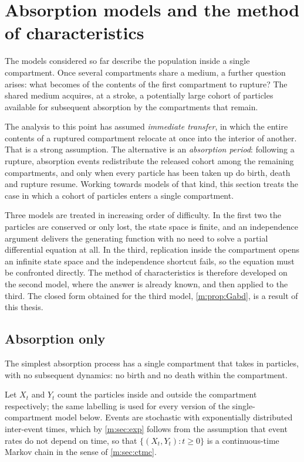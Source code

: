 \section{Absorption models and the method of characteristics}
\label{m:sec:moc}

The models considered so far describe the population inside a single compartment.
Once several compartments share a medium, a further question arises: what becomes
of the contents of the first compartment to rupture? The shared medium acquires, at
a stroke, a potentially large cohort of particles available for subsequent
absorption by the compartments that remain.

The analysis to this point has assumed \emph{immediate transfer}, in which the
entire contents of a ruptured compartment relocate at once into the interior of
another. That is a strong assumption. The alternative is an \emph{absorption
period}: following a rupture, absorption events redistribute the released cohort
among the remaining compartments, and only when every particle has been taken up do
birth, death and rupture resume. Working towards models of that kind, this section
treats the case in which a cohort of particles enters a single compartment.

Three models are treated in increasing order of difficulty. In the first two the
particles are conserved or only lost, the state space is finite, and an
independence argument delivers the generating function with no need to solve a
partial differential equation at all. In the third, replication inside the
compartment opens an infinite state space and the independence shortcut fails, so
the equation must be confronted directly. The method of characteristics is
therefore developed on the second model, where the answer is already known, and
then applied to the third. The closed form obtained for the third model,
\cref{m:prop:Gabd}, is a result of this thesis.

\subsection{Absorption only}
\label{m:sec:absonly}

The simplest absorption process has a single compartment that takes in particles,
with no subsequent dynamics: no birth and no death within the compartment.

Let $X_t$ and $Y_t$ count the particles inside and outside the compartment
respectively; the same labelling is used for every version of the
single-compartment model below. Events are stochastic with exponentially
distributed inter-event times, which by \cref{m:sec:exp} follows from the assumption
that event rates do not depend on time, so that $\{(X_t,Y_t):t\ge0\}$ is a
continuous-time Markov chain in the sense of \cref{m:sec:ctmc}.


